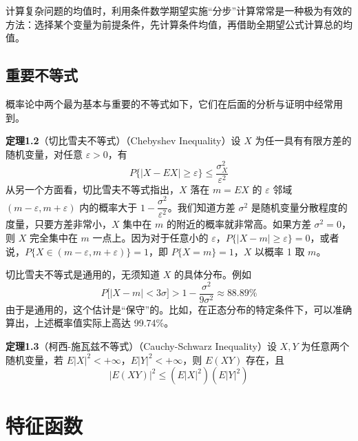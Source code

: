 \documentclass[11pt,openany,UTF8]{ctexbook}
\newcommand{\thm}[1]{\par\medskip\noindent\textbf{#1}\quad}
\begin{document}
计算复杂问题的均值时\nobreak，利用条件数学期望实施“分步”计算常常是一种极为有效的方法\nobreak：选择某个变量为前提条件\nobreak，先计算条件均值\nobreak，再借助全期望公式计算总的均值\nobreak。

\subsection{重要不等式}

概率论中两个最为基本与重要的不等式如下\nobreak，它们在后面的分析与证明中经常用到\nobreak。

\thm{定理1.2}（切比雪夫不等式\nobreak）（Chebyshev Inequality\nobreak）\quad 设 $X$ 为任一具有有限方差的随机变量\nobreak，对任意 $\varepsilon>0$\nobreak，有
\begin{equation}
P\bigl\{\lvert X-EX\rvert\geqslant\varepsilon\bigr\}\leqslant\frac{\sigma_X^2}{\varepsilon^2}
\label{eq:1.57}
\end{equation}
从另一个方面看\nobreak，切比雪夫不等式指出\nobreak，$X$ 落在 $m=EX$ 的 $\varepsilon$ 邻域 $(m-\varepsilon,m+\varepsilon)$ 内的概率大于 $1-\dfrac{\sigma^2}{\varepsilon^2}$\nobreak。我们知道方差 $\sigma^2$ 是随机变量分散程度的度量\nobreak，只要方差非常小\nobreak，$X$ 集中在 $m$ 的附近的概率就非常高\nobreak。如果方差 $\sigma^2=0$\nobreak，则 $X$ 完全集中在 $m$ 一点上\nobreak。因为对于任意小的 $\varepsilon$\nobreak，$P\bigl\{\lvert X-m\rvert\geqslant\varepsilon\bigr\}=0$\nobreak，或者说\nobreak，$P\{X\in(m-\varepsilon,m+\varepsilon)\}=1$\nobreak，即 $P\{X=m\}=1$\nobreak，$X$ 以概率 1 取 $m$\nobreak。

切比雪夫不等式是通用的\nobreak，无须知道 $X$ 的具体分布\nobreak。例如
\[
P\bigl[\lvert X-m\rvert<3\sigma\bigr]>1-\frac{\sigma^2}{9\sigma^2}\approx88.89\%
\]
由于是通用的\nobreak，这个估计是“保守”的\nobreak。比如\nobreak，在正态分布的特定条件下\nobreak，可以准确算出\nobreak，上述概率值实际上高达 99.74\%\nobreak。

\thm{定理1.3}（柯西-施瓦兹不等式\nobreak）（Cauchy-Schwarz Inequality\nobreak）\quad 设 $X,Y$ 为任意两个随机变量\nobreak，若 $E\lvert X\rvert^2<+\infty$\nobreak，$E\lvert Y\rvert^2<+\infty$\nobreak，则 $E(XY)$ 存在\nobreak，且
\begin{equation}
\lvert E(XY)\rvert^2\leqslant(E\lvert X\rvert^2)(E\lvert Y\rvert^2)
\label{eq:1.58}
\end{equation}

\section{特征函数}
\end{document}
